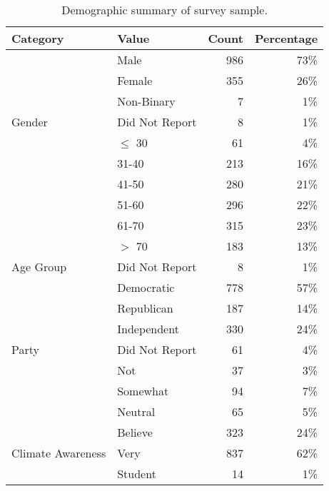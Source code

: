 \begin{table}[H]
\centering
\begin{threeparttable}
\caption{Demographic summary of survey sample.}
\centering
\begin{tabular}[t]{llrr}
\toprule
\textbf{Category} & \textbf{Value} & \textbf{Count} & \textbf{Percentage}\\
\midrule
 & Male & 986 & 73\%\\

 & Female & 355 & 26\%\\

 & Non-Binary & 7 & 1\%\\

\multirow{-4}{*}{\raggedright\arraybackslash Gender} & Did Not Report & 8 & 1\%\\
\cmidrule(lr){1-4}
 & $\leq$ 30 & 61 & 4\%\\

 & 31-40 & 213 & 16\%\\

 & 41-50 & 280 & 21\%\\

 & 51-60 & 296 & 22\%\\

 & 61-70 & 315 & 23\%\\

 & $>$ 70 & 183 & 13\%\\

\multirow{-7}{*}{\raggedright\arraybackslash Age Group} & Did Not Report & 8 & 1\%\\
\cmidrule(lr){1-4}
 & Democratic & 778 & 57\%\\

 & Republican & 187 & 14\%\\

 & Independent & 330 & 24\%\\

\multirow{-4}{*}{\raggedright\arraybackslash Party} & Did Not Report & 61 & 4\%\\
\cmidrule(lr){1-4}
 & Not & 37 & 3\%\\

 & Somewhat & 94 & 7\%\\

 & Neutral & 65 & 5\%\\

 & Believe & 323 & 24\%\\

\multirow{-5}{*}{\raggedright\arraybackslash Climate Awareness} & Very & 837 & 62\%\\
\cmidrule(lr){1-4}
 & Student & 14 & 1\%\\


\end{tabular}
\end{threeparttable}
\end{table}
